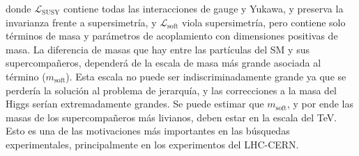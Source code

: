 \noindent
donde $\mathcal{L}_{\text{SUSY}}$ contiene todas las interacciones de gauge y Yukawa, y preserva la invarianza frente a supersimetría, y $\mathcal{L}_{\text{soft}}$ viola supersimetría, pero contiene solo términos de masa y parámetros de acoplamiento con dimensiones positivas de masa. La diferencia de masas que hay entre las partículas del SM y sus supercompañeros, dependerá de la escala de masa más grande asociada al término  ($m_{\text{soft}}$). Esta escala no puede ser indiscriminadamente grande ya que se perdería la solución al problema de jerarquía, y  las correcciones a la masa del Higgs serían extremadamente grandes. Se puede estimar 
que $m_{\text{soft}}$, y por ende las masas de los supercompañeros más livianos, deben estar en la escala del TeV. Esto es una de las motivaciones más importantes en las búsquedas experimentales, principalmente en los experimentos del LHC-CERN.




